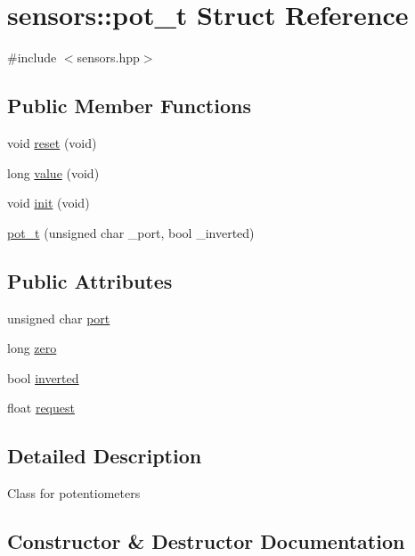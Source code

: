 \hypertarget{structsensors_1_1pot__t}{}\section{sensors\+:\+:pot\+\_\+t Struct Reference}
\label{structsensors_1_1pot__t}


{\ttfamily \#include $<$sensors.\+hpp$>$}

\subsection*{Public Member Functions}
\begin{DoxyCompactItemize}
\item 
void \hyperlink{structsensors_1_1pot__t_a79492a67771f5cf54b4efcc6ca0178b5}{reset} (void)
\item 
long \hyperlink{structsensors_1_1pot__t_a239236592ff0507f459f6e8d40d12816}{value} (void)
\item 
void \hyperlink{structsensors_1_1pot__t_ab44d6b91085fd38241c4c83b8f1cade1}{init} (void)
\item 
\hyperlink{structsensors_1_1pot__t_a118a5459f2e27e5823651172c43c30f8}{pot\+\_\+t} (unsigned char \+\_\+port, bool \+\_\+inverted)
\end{DoxyCompactItemize}
\subsection*{Public Attributes}
\begin{DoxyCompactItemize}
\item 
unsigned char \hyperlink{structsensors_1_1pot__t_a1bf5ff29049431caa618b0016421b7f2}{port}
\item 
long \hyperlink{structsensors_1_1pot__t_ad3678a63f0a9f4d3d3e864ec22161764}{zero}
\item 
bool \hyperlink{structsensors_1_1pot__t_a123c1d2c33ce2fe9284ade146451b987}{inverted}
\item 
float \hyperlink{structsensors_1_1pot__t_a364b3294c1c4a7b5247663b48189f8a5}{request}
\end{DoxyCompactItemize}


\subsection{Detailed Description}
Class for potentiometers 

\subsection{Constructor \& Destructor Documentation}
\mbox{\label{structsensors_1_1pot__t_a118a5459f2e27e5823651172c43c30f8}} 
